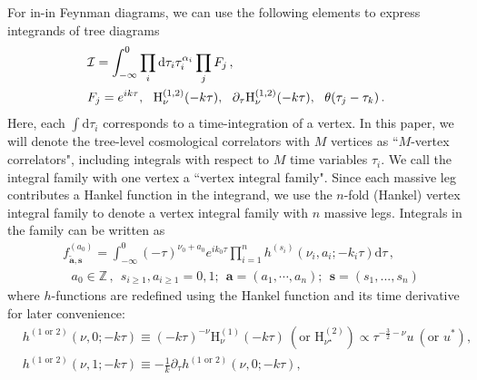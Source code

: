 \documentclass[a4paper,11pt]{article}
\newcommand{\nn}{\nonumber}
\newcommand{\nd}{\mathrm{d}}
\begin{document}
For in-in Feynman diagrams, we can use the following elements to express integrands of tree diagrams
\begin{align}
& {\cal{I}} = \int_{-\infty}^0  \prod_i \nd \tau_i \tau_i^{\alpha_i} \prod_j F_j\, , 
\nn\\
 & F_j  = e^{i k \tau} 
, ~~ \text{H}_{\nu}^{(1,2)} (-k \tau), ~~ \partial_{\tau} \text{H}_{\nu}^{(1,2)}(-k \tau), ~~ \theta(\tau_j-\tau_k) \, . \label{eq:dSintegrand}
\end{align}
Here, each $\int \nd \tau_i$ corresponds to a time-integration of a vertex. In this paper, we will denote the tree-level cosmological correlators with $M$ vertices as ``$M$-vertex correlators", including integrals with respect to $M$ time variables $\tau_i$. We call the integral family with one vertex a ``vertex integral family". Since each massive leg contributes a Hankel function in the integrand, we use the $n$-fold (Hankel) vertex integral family to denote a vertex integral family with $n$ massive legs. Integrals in the family can be written as
\begin{align}
&f^{(a_0)}_{\tilde{\bm{a}},\bm{s}}=\int_{-\infty}^0 (-\tau)^{\nu_0+a_0} e^{ik_0 \tau} 
  \prod_{i=1}^n h^{(s_i)}(\nu_i,a_i;-k_i\tau)\nd \tau \,, \nn\\
&~~~a_0\in \mathbb{Z}\, , ~~ s_{i\geq 1}, a_{i\geq 1}=0,1;~~\bm{a}=(a_1,\cdots,a_n);~~\bm{s}=(s_1,...,s_n)
\end{align}
where $h$-functions are redefined using the Hankel function and its time derivative for  later convenience: 
\begin{align}
 &h^{(1\text{ or }2)}(\nu,0;-k\tau)\equiv  (-k\tau)^{-\nu} \text{H}_{\nu}^{(1)}(-k \tau) ~ (\text{or }\text{H}_{\nu^\star}^{(2)} )\propto \tau^{-\frac{3}{2}-\nu} u ~ (\text{or } u^*),\nn\\
& h^{(1\text{ or }2)}(\nu,1;-k\tau)\equiv - \frac{1}{k} \partial_\tau h^{(1\text{ or }2)}(\nu,0;-k\tau),
\end{align}
\end{document}
